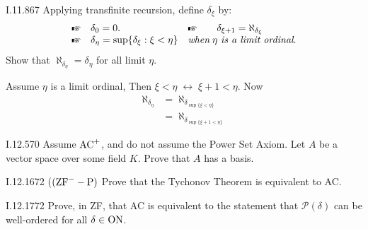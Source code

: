 \begin{lexcopy}{I.11.8}{67}
Applying transfinite recursion, define \(\delta_\xi\) by:
\begin{equation*}
\begin{array}{lll}
\mpointhand & \delta_0 = 0. &
    \mpointhand \qquad \delta_{\xi + 1} = \aleph_{\delta_\xi} \\
\mpointhand & \delta_\eta = \sup\{\delta_\xi: \xi < \eta\} &
  \textit{when}\; \eta\ \textit{is a limit ordinal}. \\
\end{array}
\end{equation*}
Show that \(\aleph_{\delta_\eta} = \delta_\eta\) for all limit \(\eta\).
\end{lexcopy}

Assume \(\eta\) is a limit ordinal, Then
\(\xi < \eta \; \leftrightarrow \; \xi + 1 < \eta\). Now
\begin{align*}
\aleph_{\delta_\eta}
  &= \aleph_{\delta_{\sup\{\xi < \eta\}}} \\
  &= \aleph_{\delta_{\sup\{\xi + 1 < \eta\}}}
\end{align*}

\unfinished

\begin{lexcopy}{I.12.5}{70}
Assume \(\textnormal{AC}^+\), and do not assume the Power Set Axiom. Let
$A$ be a vector space over some field $K$. Prove that $A$ has a basis.
\end{lexcopy}
\unfinished

\begin{lexcopy}{I.12.16}{72}
(\((\textnormal{ZF}^- -\textnormal{P})\)
Prove that the Tychonov Theorem is equivalent to AC.
\end{lexcopy}
\unfinished

\begin{lexcopy}{I.12.17}{72}
Prove, in ZF, that AC is equivalent to the statement that
\(\mathcal{P}(\delta)\) can be well-ordered
for all \(\delta \in \textnormal{ON}\).
\end{lexcopy}
\unfinished
